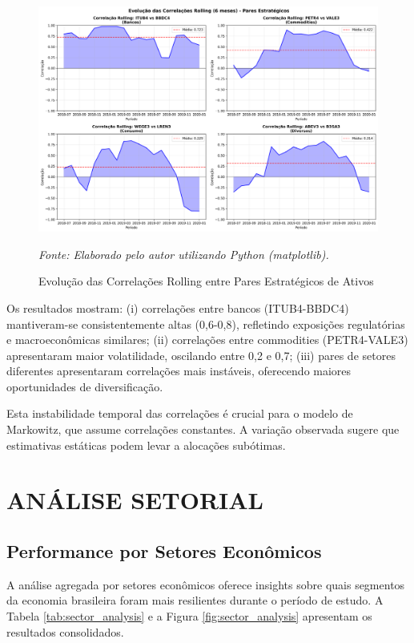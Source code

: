 \begin{figure}[H]
\centering
\includegraphics[width=\textwidth]{images/correlation_evolution.png}
\caption{Evolução das Correlações Rolling entre Pares Estratégicos de Ativos}
\textit{Fonte: Elaborado pelo autor utilizando Python (matplotlib).}
\label{fig:correlation_evolution}
\end{figure}

Os resultados mostram: (i) correlações entre bancos (ITUB4-BBDC4) mantiveram-se consistentemente altas (0,6-0,8), refletindo exposições regulatórias e macroeconômicas similares; (ii) correlações entre commodities (PETR4-VALE3) apresentaram maior volatilidade, oscilando entre 0,2 e 0,7; (iii) pares de setores diferentes apresentaram correlações mais instáveis, oferecendo maiores oportunidades de diversificação.

Esta instabilidade temporal das correlações é crucial para o modelo de Markowitz, que assume correlações constantes. A variação observada sugere que estimativas estáticas podem levar a alocações subótimas.

\section{ANÁLISE SETORIAL}

\subsection{Performance por Setores Econômicos}

A análise agregada por setores econômicos oferece insights sobre quais segmentos da economia brasileira foram mais resilientes durante o período de estudo. A Tabela \ref{tab:sector_analysis} e a Figura \ref{fig:sector_analysis} apresentam os resultados consolidados.


